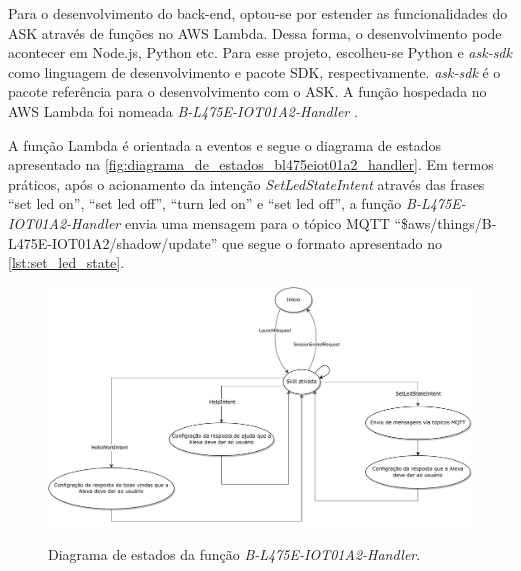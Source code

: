 Para o desenvolvimento do back-end, optou-se por estender as funcionalidades do ASK através de funções no AWS Lambda. Dessa forma, o desenvolvimento pode acontecer em Node.js, Python etc. Para esse projeto, escolheu-se Python e \textit{ask-sdk} como linguagem de desenvolvimento e pacote SDK, respectivamente. \textit{ask-sdk} é o pacote referência para o desenvolvimento com o ASK. A função hospedada no AWS Lambda foi nomeada \textit{B-L475E-IOT01A2-Handler} \cite{ref:044}.

A função Lambda é orientada a eventos e segue o diagrama de estados apresentado na \autoref{fig:diagrama_de_estados_bl475eiot01a2_handler}. Em termos práticos, após o acionamento da intenção \textit{SetLedStateIntent} através das frases ``set led on'', ``set led off'', ``turn led on'' e ``set led off'', a função \textit{B-L475E-IOT01A2-Handler} envia uma mensagem para o tópico MQTT ``\$aws/things/B-L475E-IOT01A2/shadow/update'' que segue o formato apresentado no \autoref{lst:set_led_state}.

\begin{figure}[htbp]
  \centering
  \caption{Diagrama de estados da função \textit{B-L475E-IOT01A2-Handler}.}
  \includegraphics[scale=0.61]{Imagens/diagrama_de_estados_bl475eiot01a2_handler.pdf}
  \label{fig:diagrama_de_estados_bl475eiot01a2_handler}
\end{figure}
